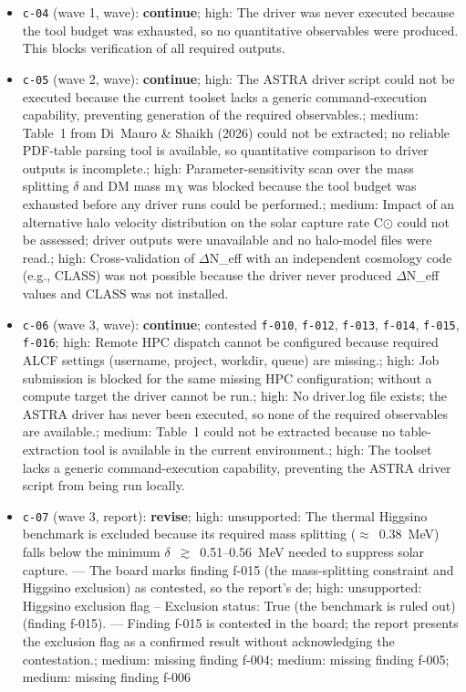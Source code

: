 \documentclass[11pt,a4paper]{article}
\begin{document}
\begin{itemize}
  \item \texttt{c-04} (wave 1, wave): \textbf{continue}; high: The driver was never executed because the tool budget was exhausted, so no quantitative observables were produced. This blocks verification of all required outputs.
  \item \texttt{c-05} (wave 2, wave): \textbf{continue}; high: The ASTRA driver script could not be executed because the current toolset lacks a generic command-execution capability, preventing generation of the required observables.; medium: Table~1 from Di~Mauro \& Shaikh (2026) could not be extracted; no reliable PDF-table parsing tool is available, so quantitative comparison to driver outputs is incomplete.; high: Parameter-sensitivity scan over the mass splitting $\delta$ and DM mass m$\chi$ was blocked because the tool budget was exhausted before any driver runs could be performed.; medium: Impact of an alternative halo velocity distribution on the solar capture rate C$\odot$ could not be assessed; driver outputs were unavailable and no halo-model files were read.; high: Cross-validation of $\Delta$N\_eff with an independent cosmology code (e.g., CLASS) was not possible because the driver never produced $\Delta$N\_eff values and CLASS was not installed.
  \item \texttt{c-06} (wave 3, wave): \textbf{continue}; contested \texttt{f-010}, \texttt{f-012}, \texttt{f-013}, \texttt{f-014}, \texttt{f-015}, \texttt{f-016}; high: Remote HPC dispatch cannot be configured because required ALCF settings (username, project, workdir, queue) are missing.; high: Job submission is blocked for the same missing HPC configuration; without a compute target the driver cannot be run.; high: No driver.log file exists; the ASTRA driver has never been executed, so none of the required observables are available.; medium: Table~1 could not be extracted because no table-extraction tool is available in the current environment.; high: The toolset lacks a generic command-execution capability, preventing the ASTRA driver script from being run locally.
  \item \texttt{c-07} (wave 3, report): \textbf{revise}; high: unsupported: The thermal Higgsino benchmark is excluded because its required mass splitting ($\approx$~0.38~MeV) falls below the minimum $\delta$~$\gtrsim$~0.51--0.56~MeV needed to suppress solar capture. --- The board marks finding f-015 (the mass-splitting constraint and Higgsino exclusion) as contested, so the report's de; high: unsupported: Higgsino exclusion flag -- Exclusion status: True (the benchmark is ruled out) (finding f-015). --- Finding f-015 is contested in the board; the report presents the exclusion flag as a confirmed result without acknowledging the contestation.; medium: missing finding f-004; medium: missing finding f-005; medium: missing finding f-006
\end{itemize}
\end{document}
